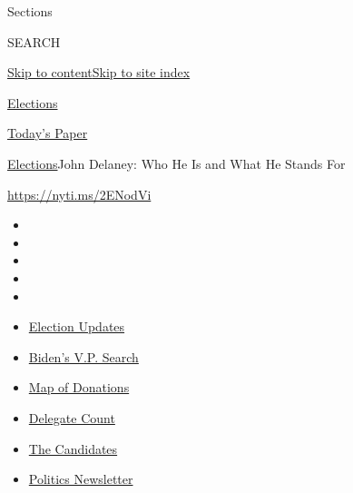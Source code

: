 Sections

SEARCH

\protect\hyperlink{site-content}{Skip to
content}\protect\hyperlink{site-index}{Skip to site index}

\href{https://www.nytimes.com/news-event/2020-election}{Elections}

\href{https://myaccount.nytimes.com/auth/login?response_type=cookie\&client_id=vi}{}

\href{https://www.nytimes.com/section/todayspaper}{Today's Paper}

\href{/news-event/2020-election}{Elections}\textbar{}John Delaney: Who
He Is and What He Stands For

\url{https://nyti.ms/2ENodVi}

\begin{itemize}
\item
\item
\item
\item
\item
\end{itemize}

\begin{itemize}
\item
  \href{https://www.nytimes.com/2020/07/31/us/elections/biden-vs-trump.html?action=click\&pgtype=Article\&state=default\&region=TOP_BANNER\&context=storylines_menu}{Election
  Updates}
\item
  \href{https://www.nytimes.com/article/biden-vice-president-2020.html?action=click\&pgtype=Article\&state=default\&region=TOP_BANNER\&context=storylines_menu}{Biden's
  V.P. Search}
\item
  \href{https://www.nytimes.com/interactive/2020/07/24/us/politics/trump-biden-campaign-donors.html?action=click\&pgtype=Article\&state=default\&region=TOP_BANNER\&context=storylines_menu}{Map
  of Donations}
\item
  \href{https://www.nytimes.com/interactive/2020/us/elections/delegate-count-primary-results.html?action=click\&pgtype=Article\&state=default\&region=TOP_BANNER\&context=storylines_menu}{Delegate
  Count}
\item
  \href{https://www.nytimes.com/interactive/2019/us/politics/2020-presidential-candidates.html?action=click\&pgtype=Article\&state=default\&region=TOP_BANNER\&context=storylines_menu}{The
  Candidates}
\item
  \href{https://www.nytimes.com/newsletters/politics?action=click\&pgtype=Article\&state=default\&region=TOP_BANNER\&context=storylines_menu}{Politics
  Newsletter}
\end{itemize}

